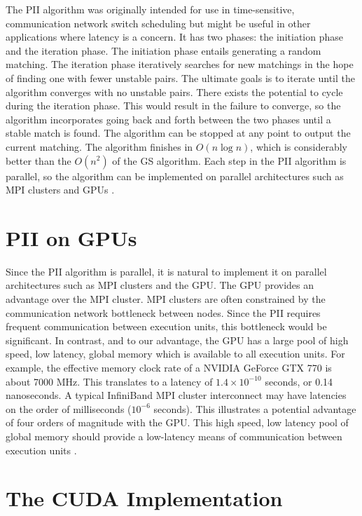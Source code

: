 \documentclass[journal]{IEEEtran}
\begin{document}
The PII algorithm was originally intended for use in time-sensitive,
communication network switch scheduling but might be useful in other
applications where latency is a concern.  It has two phases: the initiation
phase and the iteration phase.  The initiation phase entails generating a
random matching.  The iteration phase iteratively searches for new matchings in
the hope of finding one with fewer unstable pairs.  The ultimate goals is to
iterate until the algorithm converges with no unstable pairs.  There exists the
potential to cycle during the iteration phase.  This would result in the
failure to converge, so the algorithm incorporates going back and forth between
the two phases until a stable match is found.  The algorithm can be stopped at
any point to output the current matching.  The algorithm finishes in $O(n \log
n)$, which is considerably better than the $O(n^2)$ of the GS algorithm.  Each
step in the PII algorithm is parallel, so the algorithm can be implemented on
parallel architectures such as MPI clusters and GPUs
\cite{lu-zheng,lu,korakakis}.


\section{PII on GPUs}

Since the PII algorithm is parallel, it is natural to implement it on parallel
architectures such as MPI clusters and the GPU.  The GPU provides an advantage
over the MPI cluster.  MPI clusters are often constrained by the communication
network bottleneck between nodes.  Since the PII requires frequent
communication between execution units, this bottleneck would be significant.
In contrast, and to our advantage, the GPU has a large pool of high speed, low
latency, global memory which is available to all execution units.  For example,
the effective memory clock rate of a NVIDIA GeForce GTX 770 is about 7000 MHz.
This translates to a latency of $1.4 \times 10^{-10}$ seconds, or 0.14
nanoseconds.  A typical InfiniBand MPI cluster interconnect may have latencies
on the order of milliseconds ($10^{-6}$ seconds).  This illustrates a potential
advantage of four orders of magnitude with the GPU.  This high speed, low
latency pool of global memory should provide a low-latency means of
communication between execution units \cite{cook,rehman}.

\section{The CUDA Implementation}
\end{document}
